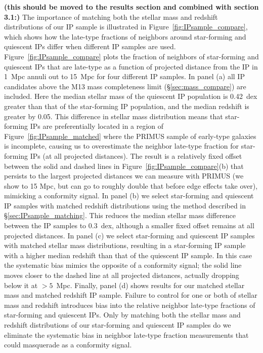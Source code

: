 

{\bf(this should be moved to the results section and combined with section 3.1:)}
The importance of matching both the stellar mass and redshift distributions of our IP sample is illustrated in Figure~\ref{fig:IPsample_compare},
which shows how the late-type fractions of neighbors around star-forming and quiescent IPs differ when different IP samples are used.
Figure~\ref{fig:IPsample_compare} plots the fraction of neighbors of star-forming and quiescent IPs that are late-type as a function of projected distance from the IP in 1~Mpc annuli out to 15~Mpc for four different IP samples.
%
In panel (a) all IP candidates above the M13 mass completeness limit (\S\ref{sec:mass_compare}) are included.
Here the median stellar mass of the quiescent IP population is 0.42~dex greater than that of the star-forming IP population, and the median redshift is greater by 0.05.
This difference in stellar mass distribution means that star-forming IPs are preferentially located in a region of Figure~\ref{fig:IPsample_matched} where the PRIMUS sample of early-type galaxies is incomplete, causing us to overestimate the neighbor late-type fraction for star-forming IPs (at all projected distances).
The result is a relatively fixed offset between the solid and dashed lines in Figure~\ref{fig:IPsample_compare}(b) that persists to the largest projected distances we can measure with PRIMUS (we show to 15 Mpc, but can go to roughly double that before edge effects take over), mimicking a conformity signal.
%
In panel (b) we select star-forming and quiescent IP samples with matched redshift distributions using the method described in \S\ref{sec:IPsample_matching}.
This reduces the median stellar mass difference between the IP samples to 0.3~dex, although a smaller fixed offset remains at all projected distances.
%
In panel (c) we select star-forming and quiescent IP samples with matched stellar mass distributions, resulting in a star-forming IP sample with a higher median redshift than that of the quiescent IP sample.
In this case the systematic bias mimics the opposite of a conformity signal; the solid line moves closer to the dashed line at all projected distances, actually dropping below it at $>5$~Mpc.
%
Finally, panel (d) shows results for our matched stellar mass and matched redshift IP sample.
Failure to control for one or both of stellar mass and redshift introduces bias into the relative neighbor late-type fractions of star-forming and quiescent IPs.
Only by matching both the stellar mass and redshift distributions of our star-forming and quiescent IP samples do we eliminate the systematic bias in neighbor late-type fraction measurements that could masquerade as a conformity signal.

